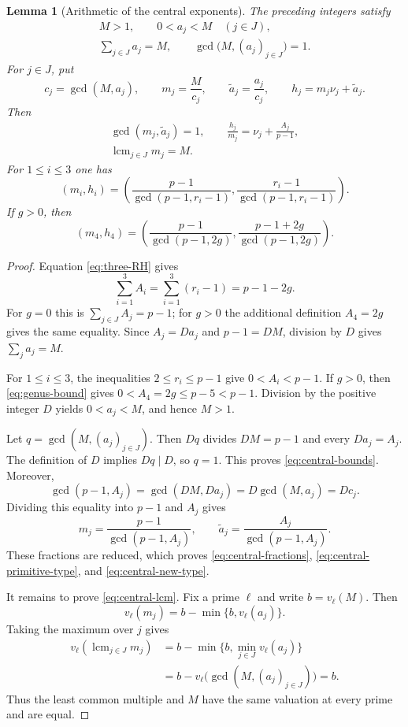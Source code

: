 \documentclass[11pt]{amsart}
\theoremstyle{plain}
\newtheorem{lemma}[theorem]{Lemma}
\theoremstyle{definition}
\numberwithin{equation}{section}
\begin{document}
\begin{lemma}[Arithmetic of the central exponents]
\label{lem:central-arithmetic}
The preceding integers satisfy
\begin{gather}
 M>1,\qquad 0<a_j<M\quad(j\in J),\\
 \sum_{j\in J}a_j=M,\qquad
 \gcd\bigl(M,(a_j)_{j\in J}\bigr)=1.
 \label{eq:central-bounds}
\end{gather}
For $j\in J$, put
\[
 c_j=\gcd(M,a_j),\qquad m_j=\frac{M}{c_j},\qquad
 \widetilde a_j=\frac{a_j}{c_j},\qquad
 h_j=m_j\nu_j+\widetilde a_j.
\]
Then
\begin{gather}
 \gcd(m_j,\widetilde a_j)=1,\qquad
 \frac{h_j}{m_j}=\nu_j+\frac{A_j}{p-1},
 \label{eq:central-fractions}\\
 \operatorname{lcm}_{j\in J}m_j=M.
 \label{eq:central-lcm}
\end{gather}
For $1\leq i\leq3$ one has
\begin{equation}\label{eq:central-primitive-type}
 (m_i,h_i)=
 \left(
  \frac{p-1}{\gcd(p-1,r_i-1)},
  \frac{r_i-1}{\gcd(p-1,r_i-1)}
 \right).
\end{equation}
If $g>0$, then
\begin{equation}\label{eq:central-new-type}
 (m_4,h_4)=
 \left(
  \frac{p-1}{\gcd(p-1,2g)},
  \frac{p-1+2g}{\gcd(p-1,2g)}
 \right).
\end{equation}
\end{lemma}

\begin{proof}
Equation \eqref{eq:three-RH} gives
\[
 \sum_{i=1}^{3}A_i
 =\sum_{i=1}^{3}(r_i-1)=p-1-2g.
\]
For $g=0$ this is $\sum_{j\in J}A_j=p-1$; for $g>0$ the additional
definition $A_4=2g$ gives the same equality.  Since $A_j=Da_j$ and
$p-1=DM$, division by $D$ gives $\sum_j a_j=M$.

For $1\leq i\leq3$, the inequalities $2\leq r_i\leq p-1$ give
$0<A_i<p-1$.  If $g>0$, then \eqref{eq:genus-bound} gives
$0<A_4=2g\leq p-5<p-1$.  Division by the positive integer $D$ yields
$0<a_j<M$, and hence $M>1$.

Let $q=\gcd(M,(a_j)_{j\in J})$.  Then $Dq$ divides $DM=p-1$ and every
$Da_j=A_j$.  The definition of $D$ implies $Dq\mid D$, so $q=1$.  This
proves \eqref{eq:central-bounds}.  Moreover,
\[
 \gcd(p-1,A_j)=\gcd(DM,Da_j)=D\gcd(M,a_j)=Dc_j.
\]
Dividing this equality into $p-1$ and $A_j$ gives
\[
 m_j=\frac{p-1}{\gcd(p-1,A_j)},\qquad
 \widetilde a_j=\frac{A_j}{\gcd(p-1,A_j)}.
\]
These fractions are reduced, which proves
\eqref{eq:central-fractions}, \eqref{eq:central-primitive-type}, and
\eqref{eq:central-new-type}.

It remains to prove \eqref{eq:central-lcm}.  Fix a prime $\ell$ and write
$b=v_\ell(M)$.  Then
\[
 v_\ell(m_j)=b-\min\{b,v_\ell(a_j)\}.
\]
Taking the maximum over $j$ gives
\begin{align*}
 v_\ell\left(\operatorname{lcm}_{j\in J}m_j\right)
 &=b-\min\bigl\{b,\min_{j\in J}v_\ell(a_j)\bigr\}\\
 &=b-v_\ell\bigl(\gcd(M,(a_j)_{j\in J})\bigr)=b.
\end{align*}
Thus the least common multiple and $M$ have the same valuation at every
prime and are equal.
\end{proof}
\end{document}
